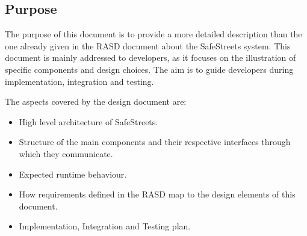 \subsection{Purpose}
The purpose of this document is to provide a more detailed description than the one already given in the RASD document about the SafeStreets system. This document is mainly addressed to developers, as it focuses on the illustration of specific components and design choices. The aim is to guide developers during implementation, integration and testing.\par
The aspects covered by the design document are:
\begin{itemize}
	\item High level architecture of SafeStreets.
	\item Structure of the main components and their respective interfaces through which they communicate.
	\item Expected runtime behaviour.
	\item How requirements defined in the RASD map to the design elements of this document.
	\item Implementation, Integration and Testing plan.
\end{itemize}

